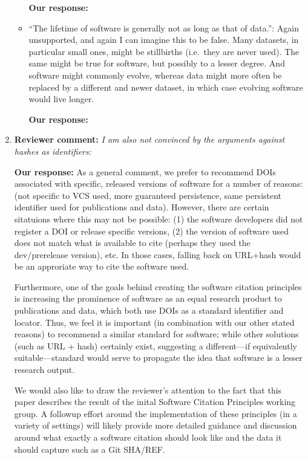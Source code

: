 \documentclass{article}
\begin{document}
\begin{enumerate}
\begin{itemize}
\textbf{Our response:}


\item{``The lifetime of software is generally not as long as that of data.'':
Again unsupported, and again I can imagine this to be false. Many datasets, in
particular small ones, might be stillbirths (i.e.\ they are never used). The
same might be true for software, but possibly to a lesser degree. And software
might commonly evolve, whereas data might more often be replaced by a
different and newer dataset, in which case evolving software would live
longer.}

\textbf{Our response:}


\end{itemize}

\item \textbf{Reviewer comment:}
\emph{I am also not convinced by the arguments against hashes as identifiers:}

\textbf{Our response:}
As a general comment, we prefer to recommend DOIs associated with specific,
released versions of software for a number of reasons: (not specific to VCS used,
more guaranteed persistence, same persistent identifier used for publications and data).
However, there are certain sitatuions where this may not be possible:
(1) the software developers did not register a DOI or release specific
versions, (2) the version of software used does not match what is available
to cite (perhaps they used the dev/prerelease version), etc. In those cases,
falling back on URL+hash would be an approriate way to cite the software used.

Furthermore, one of the goals behind creating the software citation principles
is increasing the prominence of software as an equal research product to
publications and data, which both use DOIs as a standard identifier and locator.
Thus, we feel it is important (in combination with our other stated reasons) to
recommend a similar standard for software; while other solutions (such as URL +
hash) certainly exist, suggesting a different---if equivalently suitable---standard
would serve to propagate the idea that software is a lesser research output.

We would also like to draw the reviewer's attention to the fact that this paper
describes the result of the inital Software Citation Principles working group. A
followup effort around the implementation of these principles (in a variety of
settings) will likely provide more detailed guidance and discussion around what
exactly a software citation should look like and the data it should capture such
as a Git SHA/REF.


\end{enumerate}
\end{document}
